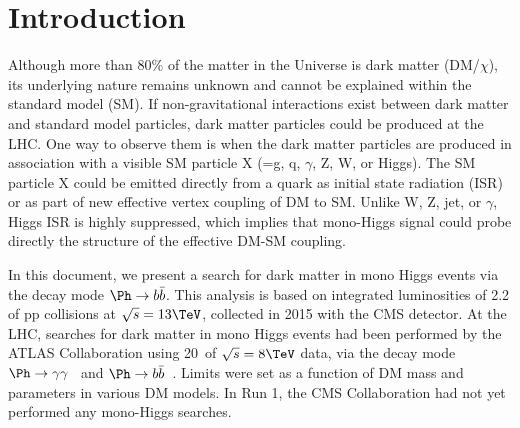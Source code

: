 \section{Introduction \label{sec:intro}}



Although more than 80\% of the matter in the Universe is dark matter (DM/$\chi$), its 
underlying nature remains unknown and cannot be explained within the standard 
model (SM). If non-gravitational interactions exist between dark matter and 
standard model particles, dark matter particles could be produced at the LHC. 
One way to observe them is when the dark matter particles are produced in 
association with a visible SM particle X (=g, q, $\gamma$, Z, W, or 
Higgs). 
%
%
The SM particle X could be emitted directly from a quark as initial state 
radiation (ISR) or as part of new effective vertex coupling of DM to SM. Unlike
W, Z, jet, or $\gamma$, Higgs ISR is highly suppressed, which implies that 
mono-Higgs signal could probe directly the structure of the effective DM-SM 
coupling. 

In this document, we present a search for dark matter in mono Higgs events 
via the decay mode $\Ph\rightarrow b\bar{b}$. This analysis is based on 
integrated luminosities of 2.2 \fbinv of pp collisions at $\sqrt{s}=13\TeV$, 
collected in 2015 with the CMS detector. 
%
%
At the LHC, searches for dark matter in mono Higgs events had been performed 
by the ATLAS Collaboration using 20~\fbinv of $\sqrt{s}=8\TeV$ data, 
via the decay mode $\Ph\rightarrow \gamma\gamma$~\cite{ATLASHAA} and 
$\Ph\rightarrow b\bar{b}$~\cite{ATLASHBB}. Limits were set as a function 
of DM mass and parameters in various DM models. In Run 1, the CMS 
Collaboration had not yet performed any mono-Higgs searches.




